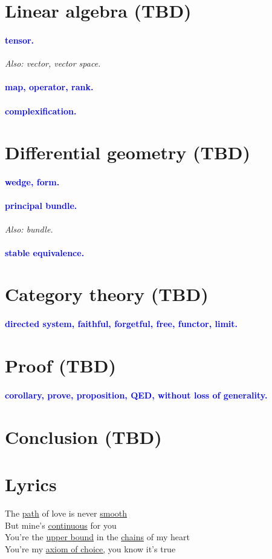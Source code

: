 \documentclass[11pt,paper=letter]{scrartcl}
\makeatletter
\renewcommand\wp[1]{\paragraph{\textcolor{Blue}{#1.}} \hspace{-1em}}
\newcommand\wl[1]{\label{w:#1}}
\newcommand\oww[1]{\textit{Also: #1.}}
\newcommand\@wo[2][]{\hyperref[w:#1]{#2}}
\newcommand\wo{\@dblarg\@wo}
\makeatother
\begin{document}
\section{Linear algebra (TBD)}

\wp{tensor}
\wl{tensor}
\oww{vector, vector space}

\wp{map, operator, rank}
\wl{map}
\wl{operator}
\wl{rank}

\wp{complexification}
\wl{complexification}

\section{Differential geometry (TBD)}

\wp{wedge, form}
\wl{wedge}
\wl{form}

\wp{principal bundle}
\wl{principal bundle}
\oww{bundle}

\wp{stable equivalence}
\wl{stable equivalence}

\section{Category theory (TBD)}


\wp{directed system, faithful, forgetful, free, functor, limit}
\wl{directed system}
\wl{faithful}
\wl{forgetful}
\wl{free}
\wl{functor}
\wl{limit}

\section{Proof (TBD)}

\wp{corollary, prove, proposition, QED, without loss of generality}
\wl{corollary}
\wl{prove}
\wl{proposition}
\wl{QED}
\wl{without loss of generality}

\section{Conclusion (TBD)}

\section{Lyrics}

\noindent
The \wo{path} of love is never \wo{smooth} \\
But mine's \wo{continuous} for you \\
You're the \wo{upper bound} in the \wo[chain]{chains} of my heart \\
You're my \wo[axiom of choice]{axiom of choice,} you know it's true \\
\end{document}
